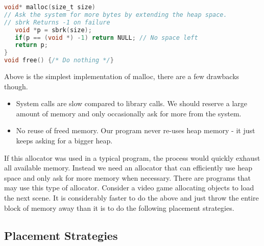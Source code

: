 \begin{lstlisting}[language=C]
void* malloc(size_t size)
// Ask the system for more bytes by extending the heap space.
// sbrk Returns -1 on failure
   void *p = sbrk(size);
   if(p == (void *) -1) return NULL; // No space left
   return p;
}
void free() {/* Do nothing */}
\end{lstlisting}

Above is the simplest implementation of malloc, there are a few drawbacks though.

\begin{itemize}
\item System calls are slow compared to library calls.
  We should reserve a large amount of memory and only occasionally ask for more from the system.
\item No reuse of freed memory.
  Our program never re-uses heap memory - it just keeps asking for a bigger heap.
\end{itemize}

If this allocator was used in a typical program, the process would quickly exhaust all available memory.
Instead we need an allocator that can efficiently use heap space and only ask for more memory when necessary.
There are programs that may use this type of allocator.
Consider a video game allocating objects to load the next scene.
It is considerably faster to do the above and just throw the entire block of memory away than it is to do the following placement strategies.

\subsection{Placement Strategies}

